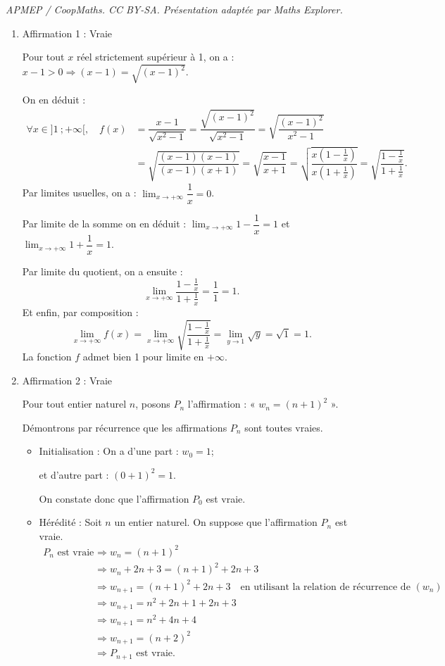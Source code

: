 \documentclass[10pt]{article}
\begin{document}
\noindent\textit{APMEP / CoopMaths. CC BY-SA. Présentation adaptée par Maths Explorer.}\par\medskip
\begin{enumerate}
\item Affirmation 1 : Vraie

Pour tout $x$ réel strictement supérieur à 1, on a : $x-1>0\Longrightarrow (x-1)=\sqrt{(x-1)^2}$.

On en déduit :
\[
\begin{aligned}
\forall x\in ]1~;+\infty[,\quad f(x)&=\dfrac{x-1}{\sqrt{x^2-1}}=\dfrac{\sqrt{(x-1)^2}}{\sqrt{x^2-1}}=\sqrt{\dfrac{(x-1)^2}{x^2-1}}\\
&=\sqrt{\dfrac{(x-1)(x-1)}{(x-1)(x+1)}}=\sqrt{\dfrac{x-1}{x+1}}=\sqrt{\dfrac{x\left(1-\frac1x\right)}{x\left(1+\frac1x\right)}}=\sqrt{\dfrac{1-\frac1x}{1+\frac1x}}.
\end{aligned}
\]
Par limites usuelles, on a : $\displaystyle\lim_{x\to +\infty}\dfrac1x=0$.

Par limite de la somme on en déduit : $\displaystyle\lim_{x\to +\infty}1-\dfrac1x=1$ et $\displaystyle\lim_{x\to +\infty}1+\dfrac1x=1$.

Par limite du quotient, on a ensuite :
\[
\lim_{x\to +\infty}\dfrac{1-\frac1x}{1+\frac1x}=\dfrac11=1.
\]
Et enfin, par composition :
\[
\lim_{x\to +\infty}f(x)=\lim_{x\to +\infty}\sqrt{\dfrac{1-\frac1x}{1+\frac1x}}=\lim_{y\to 1}\sqrt{y}=\sqrt1=1.
\]
La fonction $f$ admet bien 1 pour limite en $+\infty$.

\item Affirmation 2 : Vraie

Pour tout entier naturel $n$, posons $P_n$ l'affirmation : « $w_n=(n+1)^2$ ».

Démontrons par récurrence que les affirmations $P_n$ sont toutes vraies.

\begin{itemize}
\item Initialisation : On a d'une part : $w_0=1$;

et d'autre part : $(0+1)^2=1$.

On constate donc que l'affirmation $P_0$ est vraie.

\item Hérédité : Soit $n$ un entier naturel. On suppose que l'affirmation $P_n$ est vraie.
\[
\begin{aligned}
P_n \text{ est vraie }&\Longrightarrow w_n=(n+1)^2\\
&\Longrightarrow w_n+2n+3=(n+1)^2+2n+3\\
&\Longrightarrow w_{n+1}=(n+1)^2+2n+3 \quad \text{en utilisant la relation de récurrence de }(w_n)\\
&\Longrightarrow w_{n+1}=n^2+2n+1+2n+3\\
&\Longrightarrow w_{n+1}=n^2+4n+4\\
&\Longrightarrow w_{n+1}=(n+2)^2\\
&\Longrightarrow P_{n+1}\text{ est vraie.}
\end{aligned}
\]


\end{itemize}
\end{enumerate}
\end{document}
